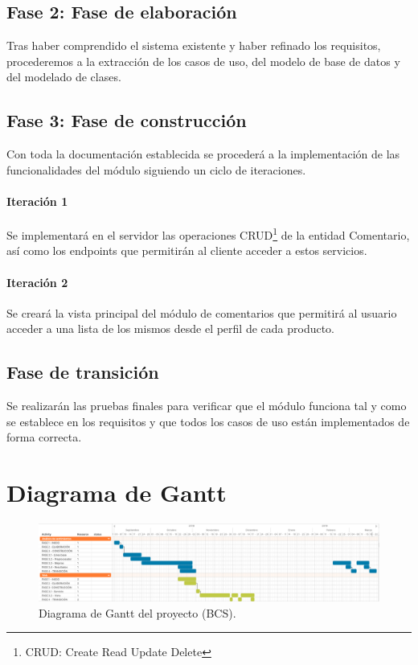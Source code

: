 \subsection{Fase 2: Fase de elaboración}

Tras haber comprendido el sistema existente y haber refinado los requisitos, procederemos a la extracción de los casos de uso, del modelo de base de datos y del modelado de clases.

\subsection{Fase 3: Fase de construcción}

Con toda la documentación establecida se procederá a la implementación de las funcionalidades del módulo siguiendo un ciclo de iteraciones.

\paragraph{Iteración 1} Se implementará en el servidor las operaciones CRUD\footnote{CRUD: Create Read Update Delete} de la entidad Comentario, así como los endpoints que permitirán al cliente acceder a estos servicios.

\paragraph{Iteración 2} Se creará la vista principal del módulo de comentarios que permitirá al usuario acceder a una lista de los mismos desde el perfil de cada producto.

\subsection{Fase de transición}

Se realizarán las pruebas finales para verificar que el módulo funciona tal y como se establece en los requisitos y que todos los casos de uso están implementados de forma correcta.

\section{Diagrama de Gantt}

\begin{figure}[!ht]
	\centering
	\includegraphics[width=1\textwidth]{imaxes/gantt.png}
	\caption{Diagrama de Gantt del proyecto (BCS).}
	\label{gant}
\end{figure}

